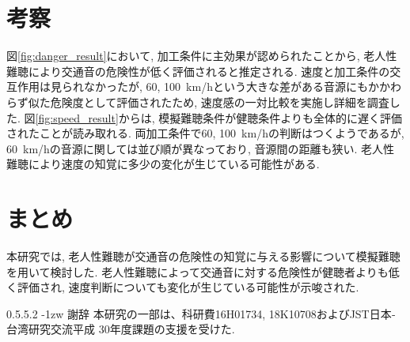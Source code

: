 \documentclass[10pt,twocolumn,uplatex,dvipdfmx]{jsarticle} %
\makeatletter
\renewcommand{\paragraph}{\@startsection{paragraph}{4}{\z@}%
    {\z@}{-1zw}%
    {\normalfont\normalsize\headfont}}
\renewcommand{\paragraph}{\@startsection{paragraph}{4}{\z@}%
    {0.5\Cvs \@plus.5\Cdp \@minus.2\Cdp}%
    {-1zw}%
    {\normalfont\normalsize\headfont}}
\makeatother
\begin{document}
\vspace{-8truemm}


\section{考察}

図\ref{fig:danger_result}において, 加工条件に主効果が認められたことから, 老人性難聴により交通音の危険性が低く評価されると推定される.
速度と加工条件の交互作用は見られなかったが, 60, 100~km/hという大きな差がある音源にもかかわらず似た危険度として評価されたため, 速度感の一対比較を実施し詳細を調査した.
図\ref{fig:speed_result}からは, 模擬難聴条件が健聴条件よりも全体的に遅く評価されたことが読み取れる. 両加工条件で60, 100~km/hの判断はつくようであるが,  60~km/hの音源に関しては並び順が異なっており, 音源間の距離も狭い. 老人性難聴により速度の知覚に多少の変化が生じている可能性がある.



\section{まとめ}

本研究では, 老人性難聴が交通音の危険性の知覚に与える影響について模擬難聴を用いて検討した. 老人性難聴によって交通音に対する危険性が健聴者よりも低く評価され, 速度判断についても変化が生じている可能性が示唆された.

\paragraph{謝辞}
 本研究の一部は、科研費16H01734, 18K10708およびJST日本‐台湾研究交流平成 30年度課題の支援を受けた.
\end{document}
